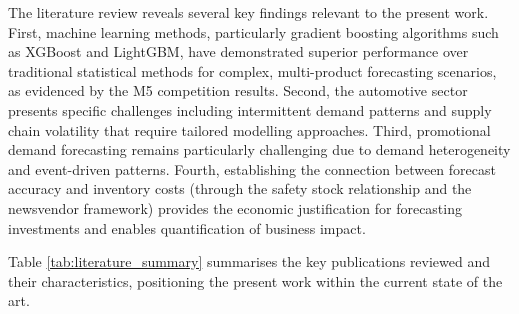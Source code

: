 \documentclass[ENG]{TFUOC}%
\begin{document}
The literature review reveals several key findings relevant to the present work. First, machine learning methods, particularly gradient boosting algorithms such as XGBoost and LightGBM, have demonstrated superior performance over traditional statistical methods for complex, multi-product forecasting scenarios, as evidenced by the M5 competition results. Second, the automotive sector presents specific challenges including intermittent demand patterns and supply chain volatility that require tailored modelling approaches. Third, promotional demand forecasting remains particularly challenging due to demand heterogeneity and event-driven patterns. Fourth, establishing the connection between forecast accuracy and inventory costs (through the safety stock relationship and the newsvendor framework) provides the economic justification for forecasting investments and enables quantification of business impact.

Table \ref{tab:literature_summary} summarises the key publications reviewed and their characteristics, positioning the present work within the current state of the art.

\setlength{\arrayrulewidth}{0.2pt}

\setlength{\arrayrulewidth}{0.2pt}
\end{document}
